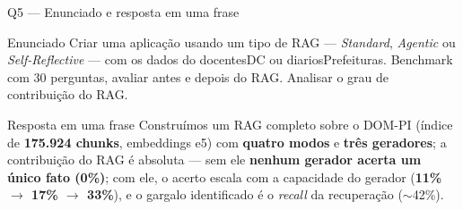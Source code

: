 \documentclass[10pt,aspectratio=169]{beamer}
\newcommand{\ganho}[1]{\textcolor{okgreen}{\textbf{#1}}}
\newcommand{\ruim}[1]{\textcolor{warnred}{\textbf{#1}}}
\begin{document}
\begin{frame}{Q5 — Enunciado e resposta em uma frase}
  \begin{block}{Enunciado}
    Criar uma aplicação usando um tipo de RAG — \emph{Standard}, \emph{Agentic} ou
    \emph{Self-Reflective} — com os dados do docentesDC ou diariosPrefeituras. Benchmark com
    30 perguntas, avaliar antes e depois do RAG. Analisar o grau de contribuição do RAG.
  \end{block}
  \vspace{4pt}
  \begin{alertblock}{Resposta em uma frase}
    Construímos um RAG completo sobre o DOM-PI (índice de \textbf{175.924 chunks}, embeddings e5)
    com \textbf{quatro modos} e \textbf{três geradores}; a contribuição do RAG é absoluta —
    sem ele \ruim{nenhum gerador acerta um único fato (0\%)}; com ele, o acerto escala com a
    capacidade do gerador (\ganho{11\% $\to$ 17\% $\to$ 33\%}), e o gargalo identificado é o
    \emph{recall} da recuperação ($\sim$42\%).
  \end{alertblock}
\end{frame}
\end{document}
